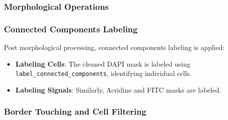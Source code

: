 \documentclass[a4paper,12pt]{article}
\begin{document}

\subsubsection{Morphological Operations}


\subsubsection{Connected Components Labeling}

Post morphological processing, connected components labeling is applied:
\begin{itemize}
    \item \textbf{Labeling Cells}: The cleaned DAPI mask is labeled using \texttt{label\_connected\_components}, identifying individual cells.
    \item \textbf{Labeling Signals}: Similarly, Acridine and FITC masks are labeled.
\end{itemize}

\subsubsection{Border Touching and Cell Filtering}

\end{document}

